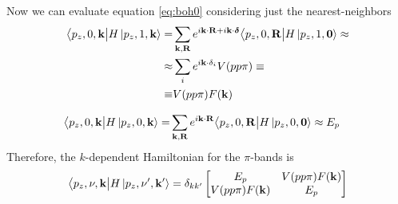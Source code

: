 Now we can evaluate equation \ref{eq:boh0} considering just the nearest-neighbors
\begin{equation}
    \begin{split}
        \big\langle p_z,0,\mathbf{k}\big|H\ket{p_z,1,\mathbf{k}}=&
        \sum_{\mathbf{k},\mathbf{R}}
        e^{i\mathbf{k}\cdot \mathbf{R} + i\mathbf{k}\cdot \boldsymbol \delta}
        \big\langle p_z,0,\mathbf{R}\big|H\ket{p_z,1,\mathbf{0}}\approx\\
        \approx&\sum_{i}e^{i\mathbf{k}\cdot\mathbf{\delta}_i}
        V(pp\pi)\equiv\\
        \equiv&V(pp\pi)F(\mathbf{k})
    \end{split}
\end{equation}


\begin{equation}
    \begin{split}
        \big\langle p_z,0,\mathbf{k}\big|H\ket{p_z,0,\mathbf{k}}=&
        \sum_{\mathbf{k},\mathbf{R}}
        e^{i\mathbf{k}\cdot \mathbf{R}}
        \big\langle p_z,0,\mathbf{R}\big|H\ket{p_z,0,\mathbf{0}}\approx E_p
    \end{split}
\end{equation}
Therefore, the $k$-dependent Hamiltonian for the $\pi$-bands is 
\begin{equation}
    \big\langle p_z,\nu,\mathbf{k}\big|H\ket{p_z,\nu',\mathbf{k}'}=\delta_{kk'}
    \begin{bmatrix}
        E_p & V(pp\pi)F(\mathbf{k})\\
        V(pp\pi)F(\mathbf{k}) & E_p
    \end{bmatrix}
\end{equation}
